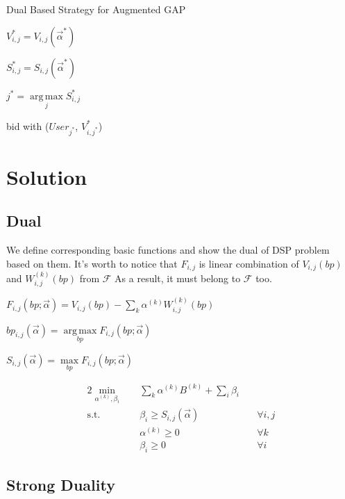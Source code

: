 \documentclass[sigconf]{acmart}
\DeclareMathOperator*{\argmax}{arg\,max}
\newcommand{\sumi}{\sum\limits_i}
\newcommand{\sumk}{\sum\limits_k}
\newcommand{\sbp}{bp_{i,j}}
\newcommand{\sV}{V_{i,j}}
\newcommand{\sW}{W_{i,j}^{(k)}}
\newcommand{\sB}{B^{(k)}}
\newcommand{\salpha}{\alpha^{(k)}}
\newcommand{\sbeta}{\beta_i}
\newcommand{\sF}{F_{i,j}}
\newcommand{\sS}{S_{i,j}}
\newcommand{\valpha}{\vec{\alpha}}
\newcommand{\uff}{\mathscr{F}}
\newcommand{\scoreconstraint}{\sbeta \ge \sS(\vec{\alpha})}
\begin{document}
\begin{algorithm}
\caption{Dual Based Strategy for Augmented GAP}

{
  {
    $\sV^* = \sV(\valpha^*)$

    $\sS^* = \sS(\valpha^*)$
  }
  $j^* = \argmax\limits_j \sS^*$
  
   { bid with ($User_{j^*}$, $V_{i,j^*}^*$) }
}
\end{algorithm}

\section{Solution}

\subsection{Dual}

We define corresponding basic functions and show the dual of DSP problem based on them.
It's worth to notice that $\sF$ is linear combination of $\sV(bp)$ and $\sW(bp)$ from $\uff$
As a result, it must belong to $\uff$ too.

\begin{definition}
$\sF(bp; \valpha) = \sV(bp) - \sumk \salpha \sW(bp)$
\end{definition}

\begin{definition}
$\sbp(\valpha) = \argmax\limits_{bp} \sF(bp; \valpha)$
\end{definition}

\begin{definition}
$\sS(\valpha) = \max\limits_{bp} \sF(bp; \valpha)$
\end{definition}

\begin{alignat}{2}
    \min\limits_{\salpha, \sbeta} \quad & \sumk \salpha \sB + \sumi \sbeta \quad & {} \\
    \mbox{s.t.} \quad                   & \scoreconstraint \quad                 & \forall i,j \\
    \quad                               & \salpha \ge 0 \quad                    & \forall k \\
    \quad                               & \sbeta \ge 0 \quad                     & \forall i
\end{alignat}

\subsection{Strong Duality}
\end{document}
